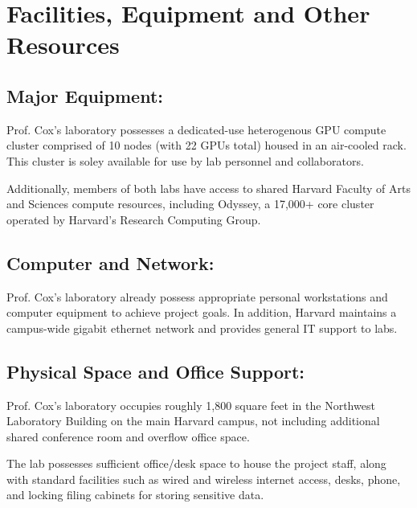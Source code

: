 \documentclass{nsfproposal}
\begin{document}
\section*{Facilities, Equipment and Other Resources}

\subsection*{Major Equipment:}
Prof. Cox's laboratory possesses a dedicated-use heterogenous GPU compute cluster comprised of 10 nodes (with 22 GPUs total) housed in an air-cooled rack.  This cluster is soley available for use by lab personnel and collaborators.

Additionally, members of both labs have access to shared Harvard Faculty of Arts and Sciences compute resources, including Odyssey, a 17,000+ core cluster operated by Harvard's Research Computing Group.


\subsection*{Computer and Network:}
Prof. Cox's laboratory already possess appropriate personal workstations and computer equipment to achieve project goals. In addition, Harvard maintains a campus-wide gigabit ethernet network and provides general IT support to labs.


\subsection*{Physical Space and Office Support:}
Prof. Cox's laboratory occupies roughly 1,800 square feet in the Northwest Laboratory Building on the main Harvard campus, not including additional shared conference room and overflow office space.

The lab possesses sufficient office/desk space to house the project staff, along with standard facilities such as wired and wireless internet access, desks, phone, and locking filing cabinets for storing sensitive data.
\end{document}
